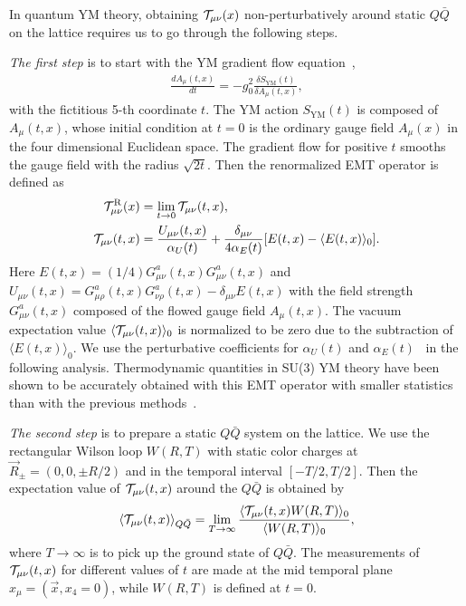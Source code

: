 \documentclass[3p,twocolumn,sort&compress]{elsarticle}
\begin{document}
In quantum YM theory, obtaining  ${\cal T}_{\mu \nu}(x)$
non-perturbatively around static $Q\bar{Q}$ on the lattice
requires us to go through the following steps.

{\it The first step} is to start with  the YM gradient flow equation~\cite{Luscher:2010iy},
\begin{align}
\frac{dA_\mu(t,x)}{dt} = -g_0^2 \frac{\delta S_{\mathrm{YM}}(t)}{\delta A_\mu (t,x)},
\end{align} 
with the fictitious 5-th coordinate $t$.
The YM action $S_{\mathrm{YM}}(t)$
is composed of $A_{\mu}(t,x)$,
whose initial condition at $t=0$ is
the ordinary gauge field $A_\mu(x)$ in the four dimensional
Euclidean space.
The gradient flow for positive $t$ smooths  the gauge field
with the radius $ \sqrt{2t}$.
Then the renormalized EMT operator is defined as ~\cite{Suzuki:2013gza}
\begin{align}
 {\cal T}^{\rm R}_{\mu\nu}(x)&=\lim_{t\rightarrow0}{\cal T}_{\mu\nu}(t,x),\\
 {\cal T}_{\mu\nu}(t,x)&=\frac{U_{\mu\nu}(t,x)}{\alpha_U(t)}
  +\frac{\delta_{\mu\nu}}{4\alpha_E(t)}  [E(t,x)- \langle E(t,x)
 \rangle_0 ].
\end{align}
Here $E(t,x)=(1/4)G_{\mu\nu}^a(t,x)G_{\mu\nu}^a(t,x)$ and
$U_{\mu\nu}(t,x)=G_{\mu\rho}^a(t,x)G_{\nu\rho}^a(t,x)-\delta_{\mu\nu}E(t,x)$
with the field strength $G_{\mu\nu}^a(t,x)$ composed of the flowed gauge field $A_\mu (t,x)$.
The vacuum expectation value $\langle {\cal T}_{\mu\nu}(t,x) \rangle_0$ is normalized to be zero due to the subtraction of $\langle E(t,x) \rangle_0$.
We use the perturbative coefficients for $\alpha_U(t)$ and
$\alpha_E(t)$~\cite{Suzuki:2013gza} in the following analysis.
Thermodynamic quantities in SU(3) YM  theory 
have been shown to be accurately obtained with this EMT operator
with smaller statistics
than with the previous methods~\cite{Asakawa:2013laa,Kamata:2016any,Kitazawa:2016dsl}.


{\it The second step} is to prepare a static $Q\bar{Q}$ system on the lattice.
We use the rectangular  Wilson loop $W(R,T)$
with static  color charges at
 $\vec{R}_{\pm}=(0,0, \pm  R/2)$ and in the temporal interval $[-T/2, T/2]$.
Then the  expectation value of ${\cal T}_{\mu\nu}(t,x)$ around the $Q\bar{Q}$ 
is obtained by \cite{Luscher:1981}
\begin{align}
  \langle {\cal T}_{\mu\nu}(t,x)\rangle_{Q\bar{Q}} =
  \lim_{T\to\infty} \frac{\langle  {\cal T}_{\mu\nu}(t,x) W(R,T)\rangle_0}
      {\langle W(R,T)\rangle_0} ,
      \label{eq:<T>_W} 
\end{align}
where $T \rightarrow \infty$ is to pick up the ground state of
$Q\bar{Q}$.
The measurements of ${\cal T}_{\mu\nu}(t,x)$ for different values of $t$
are made at the mid temporal plane $x_{\mu} =(\vec{x}, x_4=0)$,
while $W(R,T)$ is defined at $t=0$.
\end{document}
